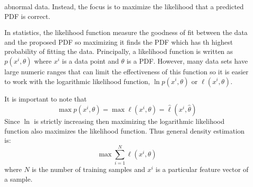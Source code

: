 \documentclass[10pt,a4paper]{report}
\begin{document}
					abnormal data. Instead, the focus is to maximize the likelihood that a predicted PDF is correct. \par
					In statistics, the likelihood function measure the goodness of fit between the data and the proposed PDF so maximizing it finds the PDF which
					has th highest probability of fitting the data.
					Principally, a likelihood function is written as $p(x^i,\theta)$ where $x^i$ is a data point and $\theta$ is a PDF.
					However, many data sets have large  numeric ranges that can limit the effectiveness of this function so it is easier to work with the
					logarithmic likelihood function, $\ln p(x^i,\theta)$ or $\ell(x^i,\theta)$. \par
					It is important to note that
					\begin{equation}
						\max p(x^i,\theta) = \max \ell(x^i,\theta) = \widehat{\ell}(x^i, \widehat{\theta})
					\end{equation}
					Since $\ln$ is strictly increasing then maximizing the logarithmic likelihood function also maximizes the likelihood function. Thus general density estimation \autocite[p. 4]{SurveyOfOptimizationMethods} is:
					\begin{equation}
						\max \sum_{i=1}^N \ell(x^i,\theta)
					\end{equation}
					where $N$ is the number of training samples and $x^i$ is a particular feature vector of a sample.
\end{document}
